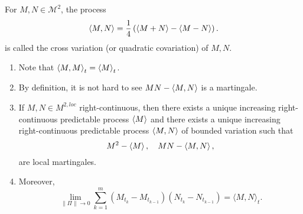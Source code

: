 \begin{defn}
    For $M,N \in \mathcal{M}^2$, the process
    \begin{equation*}
    	\left\langle M,N \right\rangle = \frac{1}{4}\left(\left\langle M+N \right\rangle- \left\langle M-N \right\rangle\right).
    \end{equation*}
    is called the cross variation (or quadratic covariation) of $M,N$.
\end{defn}
\begin{rmk}
    \begin{enumerate}[label=(\roman*)]
    	\item Note that $\left\langle M,M \right\rangle_t = \left\langle M \right\rangle_t$.
    	\item By definition, it is not hard to see $MN - \left\langle M,N \right\rangle$ is a martingale.
    	\item If $M,N \in M^{2,loc}$ right-continuous, then there exists a unique increasing right-continuous predictable process $\left\langle M \right\rangle$ and there exists a unique increasing right-continuous predictable process $\left\langle M,N \right\rangle$ of bounded variation such that
    	\begin{equation*}
    		M^2- \left\langle M \right\rangle,\quad MN - \left\langle M,N \right\rangle,
    	\end{equation*}
    	are local martingales.
    	\item Moreover,
    	\begin{equation*}
    		\lim _{\|\Pi\| \rightarrow 0} \sum_{k=1}^m\left(M_{t_k}-M_{t_{k-1}}\right)\left(N_{t_k}-N_{t_{k-1}}\right)=\langle M, N\rangle_t.
    	\end{equation*}
    \end{enumerate}
\end{rmk}

